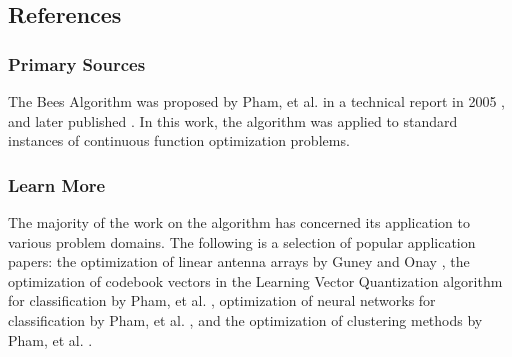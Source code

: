 

\subsection{References}

% 
% 
\subsubsection{Primary Sources}
The Bees Algorithm was proposed by Pham, et al. in a technical report in 2005 \cite{Pham2005}, and later published \cite{Pham2006}. In this work, the algorithm was applied to standard instances of continuous function optimization problems.

% 
% 
\subsubsection{Learn More}
The majority of the work on the algorithm has concerned its application to various problem domains.
The following is a selection of popular application papers: the optimization of linear antenna arrays by Guney and Onay \cite{Guney2007}, the optimization of codebook vectors in the Learning Vector Quantization algorithm for classification by Pham, et al. \cite{Pham2006a}, optimization of neural networks for classification by Pham, et al. \cite{Pham2006b}, and the optimization of clustering methods by Pham, et al. \cite{Pham2007}.


